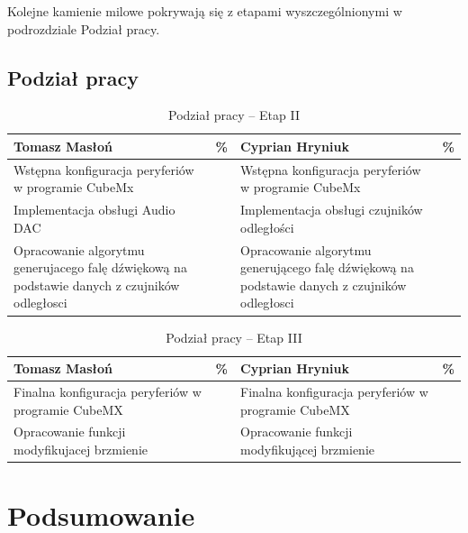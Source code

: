 \documentclass[10pt, a4paper]{article}
\begin{document}
Kolejne kamienie milowe pokrywają się z etapami wyszczególnionymi w podrozdziale Podział pracy.
\subsection{Podział pracy}

\begin{table}[H]
	\centering
	\begin{tabular}{|L{7cm}|L{0.8cm}||L{7cm}|L{0.8cm}|}
		\hline
		\hline
		\textbf{Tomasz Masłoń} & 
		\% & 
		\textbf{Cyprian Hryniuk} & \%\\
		\hline
		\hline
		Wstępna konfiguracja peryferiów w programie CubeMx		& &	
		 	Wstępna konfiguracja peryferiów w programie CubeMx	&\\
		\hline
		Implementacja obsługi Audio DAC & &
		 	Implementacja obsługi czujników odległości&\\
		\hline
		Opracowanie algorytmu generujacego falę dźwiękową na podstawie danych z czujników odległosci & &
		Opracowanie algorytmu generującego falę dźwiękową na podstawie danych z czujników odległosci & \\
		\hline
		\end{tabular}
	\caption{Podział pracy -- Etap II}
	\label{tab:PodzialPracyEtap2}
\end{table}

\begin{table}[H]
	\centering
	\begin{tabular}{|L{7cm}|L{0.8cm}||L{7cm}|L{0.8cm}|}
		\hline
		\hline
		\textbf{Tomasz Masłoń} & 
		\% & 
		\textbf{Cyprian Hryniuk} & \%\\
		\hline
		\hline
		Finalna konfiguracja peryferiów w programie CubeMX		& &	
		Finalna konfiguracja peryferiów w programie CubeMX &\\
		\hline
		Opracowanie funkcji modyfikujacej brzmienie  & &
		Opracowanie funkcji modyfikującej brzmienie &\\
		\hline	
	\end{tabular}
	\caption{Podział pracy -- Etap III}
	\label{tab:PodzialPracyEtap3}
\end{table}


\section{Podsumowanie}

\newpage
{}


\end{document}
